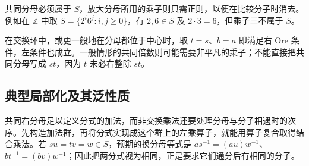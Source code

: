 共同分母必须属于 \(S\)，放大分母所用的乘子则只需正则，以便在比较分子时消去。例如在 \(\mathbb Z\) 中取 \(S=\{2^i6^j:i,j\ge0\}\)，有 \(2,6\in S\) 及 \(2\cdot3=6\)，但乘子三不属于 \(S\)。

\ProseParagraphBreak
在交换环中，或更一般地在分母都位于中心时，取 \(t=s\)、\(b=a\) 即满足右 Ore 条件，左条件也成立。一般情形的共同倍数则可能需要非平凡的乘子；不能直接把共同分母写成 \(st\)，因为 \(t\) 未必右整除 \(st\)。

\subsection{典型局部化及其泛性质}
\label{b2:subsec:1901:03}

共同右分母足以定义分式的加法，而非交换乘法还要处理分母与分子相遇时的次序。先构造加法群，再将分式实现成这个群上的左乘算子，就能用算子复合取得结合乘法。若 \(su=tv=w\in S\)，预期的换分母等式是 \(as^{-1}=(au)w^{-1}\)、\(bt^{-1}=(bv)w^{-1}\)；因此把两分式视为相同，正是要求它们通分后有相同的分子。

